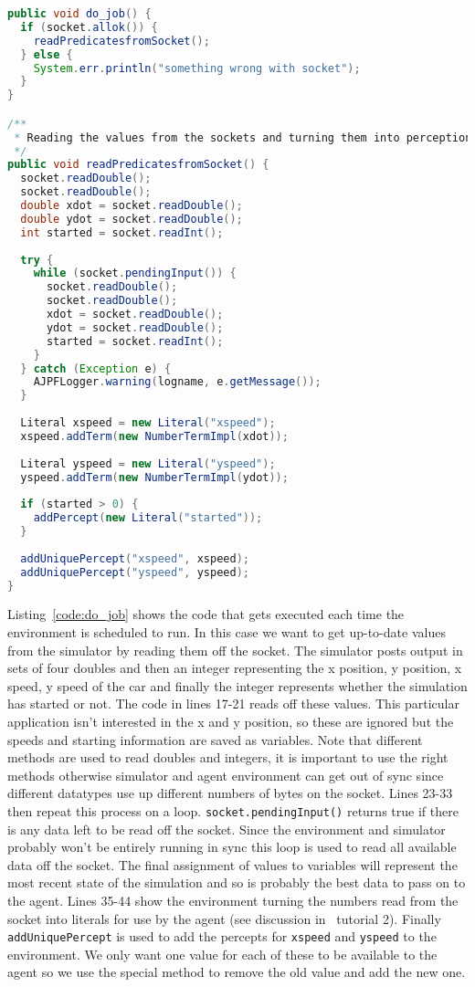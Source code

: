 \documentclass[a4]{article}
\begin{document}
\begin{lstlisting}[float,caption=Overriding do\_job,basicstyle=\sffamily,language=Java,label=code:do_job,style=easslisting]
public void do_job() {
  if (socket.allok()) {
    readPredicatesfromSocket();
  }	else {
    System.err.println("something wrong with socket");
  }
}

/**
 * Reading the values from the sockets and turning them into perceptions.
 */
public void readPredicatesfromSocket() {
  socket.readDouble();
  socket.readDouble();
  double xdot = socket.readDouble();
  double ydot = socket.readDouble();
  int started = socket.readInt();
		
  try {
    while (socket.pendingInput()) {
      socket.readDouble();
      socket.readDouble();
      xdot = socket.readDouble();
      ydot = socket.readDouble();
      started = socket.readInt();			
    }
  } catch (Exception e) {
    AJPFLogger.warning(logname, e.getMessage());
  } 
		
  Literal xspeed = new Literal("xspeed");
  xspeed.addTerm(new NumberTermImpl(xdot));
		
  Literal yspeed = new Literal("yspeed");
  yspeed.addTerm(new NumberTermImpl(ydot));
		
  if (started > 0) {
    addPercept(new Literal("started"));
  }
		
  addUniquePercept("xspeed", xspeed);
  addUniquePercept("yspeed", yspeed);
}
\end{lstlisting}
Listing~\ref{code:do_job} shows the code that gets executed each time the environment is scheduled to run.  In this case we want to get up-to-date values from the simulator by reading them off the socket.  The simulator posts output in sets of four doubles and then an integer representing the x position, y position, x speed, y speed of the car and finally the integer represents whether the simulation has started or not.  The code in lines 17-21 reads off these values.  This particular application isn't interested in the x and y position, so these are ignored but the speeds and starting information are saved as variables.  Note that different methods are used to read doubles and integers, it is important to use the right methods otherwise simulator and agent environment can get out of sync since different datatypes use up different numbers of bytes on the socket.  Lines 23-33 then repeat this process on a loop.  \texttt{socket.pendingInput()} returns true if there is any data left to be read off the socket.  Since the environment and simulator probably won't be entirely running in sync this loop is used to read all available data off the socket.  The final assignment of values to variables will represent the most recent state of the simulation and so is probably the best data to pass on to the agent.  Lines 35-44 show the environment turning the numbers read from the socket into literals for use by the agent (see discussion in \ail\ tutorial 2).  Finally \texttt{addUniquePercept} is used to add the percepts for \texttt{xspeed} and \texttt{yspeed} to the environment.  We only want one value for each of these to be available to the agent so we use the special method to remove the old value and add the new one.
\end{document}
